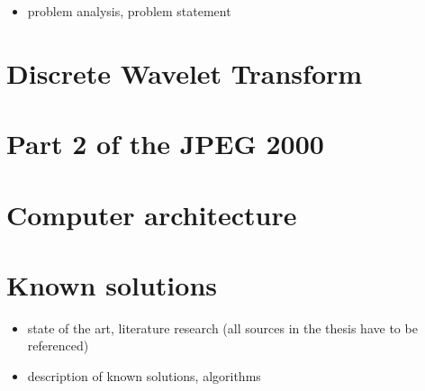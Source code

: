\begin{itemize}
    \item problem analysis, problem statement
\end{itemize}

\section{Discrete Wavelet Transform}



\section{Part 2 of the JPEG 2000}



\section{Computer architecture}

    

\section{Known solutions}


\begin{itemize}
    \item state of the art, literature research (all sources in the thesis have to be referenced)
    \item description of known solutions, algorithms
\end{itemize}
